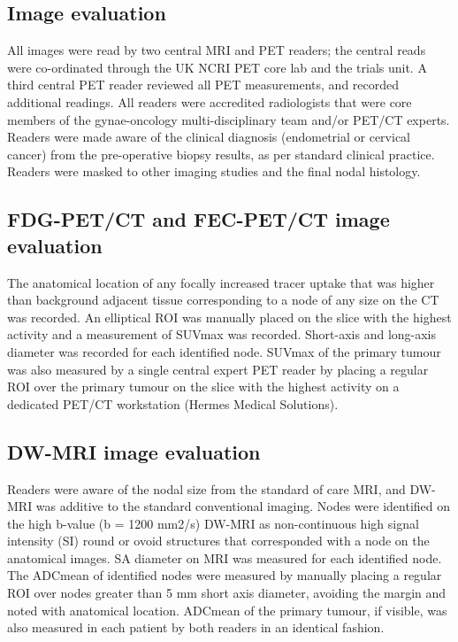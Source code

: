 \documentclass[sn-standardnature]{sn-jnl}
\theoremstyle{thmstyleone}%
\theoremstyle{thmstyletwo}%
\theoremstyle{thmstylethree}%
\begin{document}
    \subsection{Image evaluation}
    All images were read by two central MRI and PET readers; the central reads were co-ordinated through the UK NCRI PET core lab and the trials unit. 
    A third central PET reader reviewed all PET measurements, and recorded additional readings. %
    All readers were accredited radiologists that were core members of the gynae-oncology multi-disciplinary team and/or PET/CT experts. 
    Readers were made aware of the clinical diagnosis (endometrial or cervical cancer) from the pre-operative biopsy results, as per standard clinical practice. 
    Readers were masked to other imaging studies and the final nodal histology.

    \subsection{FDG-PET/CT and FEC-PET/CT image evaluation}
    The anatomical location of any focally increased tracer uptake that was higher than background adjacent tissue corresponding to a node of any size on the CT was recorded. 
    An elliptical ROI was manually placed on the slice with the highest activity and a measurement of SUVmax was recorded. 
    Short-axis and long-axis diameter was recorded for each identified node. 
    SUVmax of the primary tumour was also measured by a single central expert PET reader by placing a regular ROI over the primary tumour on the slice with the highest activity on a dedicated PET/CT workstation (Hermes Medical Solutions).

    \subsection{DW-MRI image evaluation}
    Readers were aware of the nodal size from the standard of care MRI, and DW-MRI was additive to the standard conventional imaging. 
    Nodes were identified on the high b-value (b = 1200 mm2/s) DW-MRI as non-continuous high signal intensity (SI) round or ovoid structures that corresponded with a node on the anatomical images. 
    SA diameter on MRI was measured for each identified node. 
    The ADCmean of identified nodes were measured by manually placing a regular ROI over nodes greater than 5 mm short axis diameter, avoiding the margin and noted with anatomical location. 
    ADCmean of the primary tumour, if visible, was also measured in each patient by both readers in an identical fashion.
\end{document}
